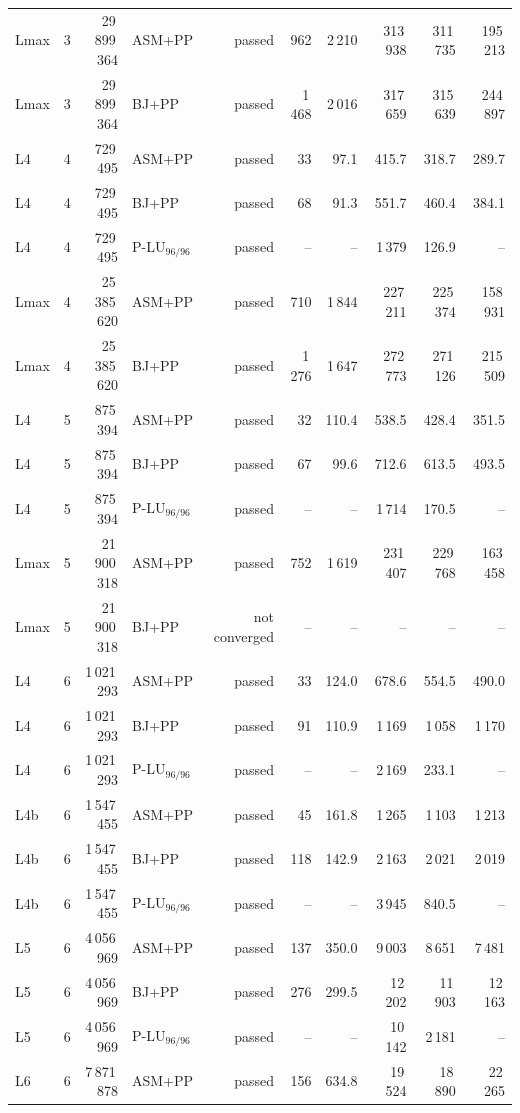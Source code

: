 \begin{tabular}{lrrlrrrrrr}
Lmax & 3 & 29\,899\,364 & ASM+PP & passed & 962 & 2\,210 & 313\,938 & 311\,735 & 195\,213\\
Lmax & 3 & 29\,899\,364 & BJ+PP & passed & 1\,468 & 2\,016 & 317\,659 & 315\,639 & 244\,897\\
L4 & 4 & 729\,495 & ASM+PP & passed & 33 & 97.1 & 415.7 & 318.7 & 289.7\\
L4 & 4 & 729\,495 & BJ+PP & passed & 68 & 91.3 & 551.7 & 460.4 & 384.1\\
L4 & 4 & 729\,495 & P-LU$_{96/96}$ & passed & -- & -- & 1\,379 & 126.9 & --\\
Lmax & 4 & 25\,385\,620 & ASM+PP & passed & 710 & 1\,844 & 227\,211 & 225\,374 & 158\,931\\
Lmax & 4 & 25\,385\,620 & BJ+PP & passed & 1\,276 & 1\,647 & 272\,773 & 271\,126 & 215\,509\\
L4 & 5 & 875\,394 & ASM+PP & passed & 32 & 110.4 & 538.5 & 428.4 & 351.5\\
L4 & 5 & 875\,394 & BJ+PP & passed & 67 & 99.6 & 712.6 & 613.5 & 493.5\\
L4 & 5 & 875\,394 & P-LU$_{96/96}$ & passed & -- & -- & 1\,714 & 170.5 & --\\
Lmax & 5 & 21\,900\,318 & ASM+PP & passed & 752 & 1\,619 & 231\,407 & 229\,768 & 163\,458\\
Lmax & 5 & 21\,900\,318 & BJ+PP & not converged & -- & -- & -- & -- & --\\
L4 & 6 & 1\,021\,293 & ASM+PP & passed & 33 & 124.0 & 678.6 & 554.5 & 490.0\\
L4 & 6 & 1\,021\,293 & BJ+PP & passed & 91 & 110.9 & 1\,169 & 1\,058 & 1\,170\\
L4 & 6 & 1\,021\,293 & P-LU$_{96/96}$ & passed & -- & -- & 2\,169 & 233.1 & --\\
L4b & 6 & 1\,547\,455 & ASM+PP & passed & 45 & 161.8 & 1\,265 & 1\,103 & 1\,213\\
L4b & 6 & 1\,547\,455 & BJ+PP & passed & 118 & 142.9 & 2\,163 & 2\,021 & 2\,019\\
L4b & 6 & 1\,547\,455 & P-LU$_{96/96}$ & passed & -- & -- & 3\,945 & 840.5 & --\\
L5 & 6 & 4\,056\,969 & ASM+PP & passed & 137 & 350.0 & 9\,003 & 8\,651 & 7\,481\\
L5 & 6 & 4\,056\,969 & BJ+PP & passed & 276 & 299.5 & 12\,202 & 11\,903 & 12\,163\\
L5 & 6 & 4\,056\,969 & P-LU$_{96/96}$ & passed & -- & -- & 10\,142 & 2\,181 & --\\
L6 & 6 & 7\,871\,878 & ASM+PP & passed & 156 & 634.8 & 19\,524 & 18\,890 & 22\,265\\

\end{tabular}

